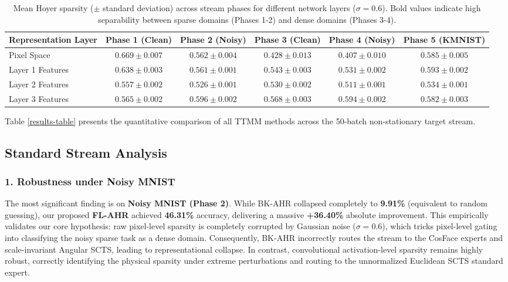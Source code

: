 \documentclass{article}
\theoremstyle{plain}
\theoremstyle{definition}
\theoremstyle{remark}
\begin{document}
\begin{table}[t]
\caption{Mean Hoyer sparsity ($\pm$ standard deviation) across stream phases for different network layers ($\sigma=0.6$). Bold values indicate high separability between sparse domains (Phases 1-2) and dense domains (Phases 3-4).}
\label{layer-ablation-table}
\vskip 0.04in
\begin{center}
\setlength{\tabcolsep}{5pt}
\begin{footnotesize}
\begin{tabular}{lccccc}
\toprule
\textbf{Representation Layer} & \textbf{Phase 1 (Clean)} & \textbf{Phase 2 (Noisy)} & \textbf{Phase 3 (Clean)} & \textbf{Phase 4 (Noisy)} & \textbf{Phase 5 (KMNIST)} \\
\midrule
Pixel Space & $0.669 \pm 0.007$ & $0.562 \pm 0.004$ & $0.428 \pm 0.013$ & $0.407 \pm 0.010$ & $0.585 \pm 0.005$ \\
Layer 1 Features & $0.638 \pm 0.003$ & $0.561 \pm 0.001$ & $0.543 \pm 0.003$ & $0.531 \pm 0.002$ & $0.593 \pm 0.002$ \\
Layer 2 Features & \textbf{$0.557 \pm 0.002$} & \textbf{$0.526 \pm 0.001$} & \textbf{$0.530 \pm 0.002$} & \textbf{$0.511 \pm 0.001$} & \textbf{$0.534 \pm 0.001$} \\
Layer 3 Features & $0.565 \pm 0.002$ & $0.596 \pm 0.002$ & $0.568 \pm 0.003$ & $0.594 \pm 0.002$ & $0.582 \pm 0.003$ \\
\bottomrule
\end{tabular}
\end{footnotesize}
\end{center}
\vspace*{-8pt}
\end{table}

Table \ref{results-table} presents the quantitative comparison of all TTMM methods across the 50-batch non-stationary target stream. 

\subsection{Standard Stream Analysis}

\subsubsection*{1. Robustness under Noisy MNIST}
The most significant finding is on \textbf{Noisy MNIST (Phase 2)}. While BK-AHR collapsed completely to \textbf{9.91\%} (equivalent to random guessing), our proposed \textbf{FL-AHR} achieved \textbf{46.31\%} accuracy, delivering a massive \textbf{+36.40\%} absolute improvement. This empirically validates our core hypothesis: raw pixel-level sparsity is completely corrupted by Gaussian noise ($\sigma=0.6$), which tricks pixel-level gating into classifying the noisy sparse task as a dense domain. Consequently, BK-AHR incorrectly routes the stream to the CosFace experts and scale-invariant Angular SCTS, leading to representational collapse. In contrast, convolutional activation-level sparsity remains highly robust, correctly identifying the physical sparsity under extreme perturbations and routing to the unnormalized Euclidean SCTS standard expert.
\end{document}
